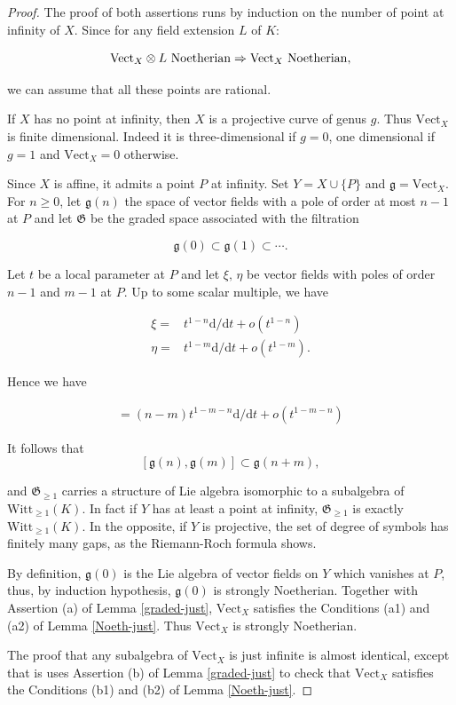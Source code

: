 \documentclass[11pt, letterpaper, reqno]{amsart}
\theoremstyle{definition}
\newcommand{\fg}{\mathfrak{g}}
\newcommand{\fG}{\mathfrak{G}}
\newcommand{\Vect}{\mathrm{Vect}}
\newcommand{\Witt}{\mathrm{Witt}}
\renewcommand{\d}{\mathrm{d}}
\begin{document}
\begin{proof}
 The proof of both assertions runs by induction on the number of point at infinity of $X$. 
 Since for any field extension $L$ of $K$: 

$$ \Vect_X\otimes L {\rm\,\, Noetherian}
\Rightarrow \Vect_X{\rm\,\,Noetherian},$$

\noindent we can assume that all these points are rational.
 
If $X$ has no point at infinity, then 
$X$ is a projective curve of genus $g$. Thus
$\Vect_X$ is finite dimensional. Indeed
it is three-dimensional if $g=0$, one dimensional if
$g=1$ and $\Vect_X=0$ otherwise. 
 
Since $X$ is affine,  it admits
a point $P$ at infinity. Set $Y=X\cup\{P\}$ and $\fg=\Vect_X$.  For $n\geq 0$, let $\fg(n)$ the space of vector fields with a pole of order at most $n-1$
at $P$ and let $\fG$ be the graded space associated with the filtration 

$$\fg(0)\subset \fg(1)\subset\cdots.$$

Let $t$ be a local parameter at $P$ and let  
$\xi,\, \eta$ be vector fields with poles of order $n-1$ and $m-1$ at $P$. Up to some scalar multiple, we have

\begin{align*}
\xi=& t^{1-n}\d/\d t + o(t^{1-n})\\ 
\eta=& t^{1-m}\d/\d t + o(t^{1-m}).
\end{align*}

\noindent  Hence we have

\begin{align*}
[\xi,\eta]= (n-m) t^{1-m-n}\d/\d t + o(t^{1-m-n})
\end{align*}

It follows that 
$$[\fg(n),\fg(m)]\subset \fg(n+m),$$

\noindent and
$\fG_{\geq 1}$ carries a structure of Lie algebra isomorphic to a subalgebra of 
$\Witt_{\geq 1}(K)$. In fact if $Y$ has at least 
a point at infinity, $\fG_{\geq 1}$ is exactly
$\Witt_{\geq 1}(K)$. In the opposite, if $Y$ is projective, the set of degree of symbols has finitely many gaps, as the Riemann-Roch formula 
shows.

By definition, $\fg(0)$ is the Lie algebra of
vector fields on $Y$ which vanishes at $P$,
thus, by induction hypothesis,  $\fg(0)$ is strongly Noetherian. Together with Assertion (a) of Lemma \ref{graded-just}, $\Vect_X$ satisfies the Conditions (a1) and (a2) of
Lemma \ref{Noeth-just}. Thus $\Vect_X$ is strongly Noetherian.

The proof that any subalgebra of $\Vect_X$ is just infinite is almost identical, except that
is uses Assertion (b) of Lemma \ref{graded-just}
to check that $\Vect_X$ satisfies the Conditions (b1) and (b2) of
Lemma \ref{Noeth-just}.
\end{proof}
\end{document}
